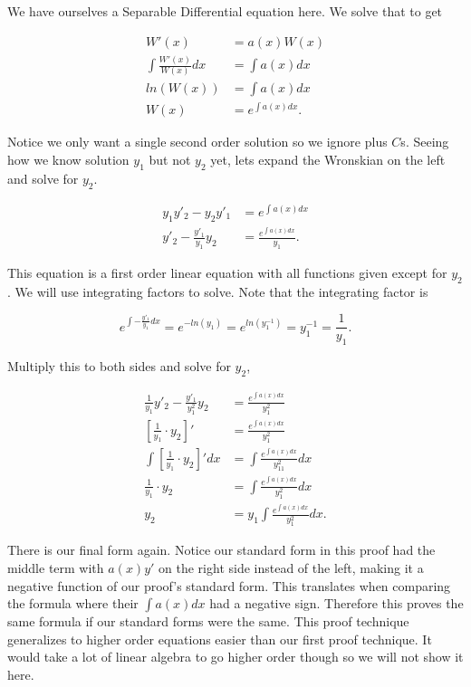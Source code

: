 \documentclass[12pt]{article}
\begin{document}
We have ourselves a Separable Differential equation here. We solve that to get

\begin{align*}
    W'(x)&=a(x)W(x) \\
    \int \frac{W'(x)}{W(x)} dx &= \int a(x) dx \\
    ln\left(W(x)\right) &= \int a(x) dx \\
    W(x)&=e^{\int a(x) dx}.
\end{align*}

Notice we only want a single second order solution so we ignore plus $C$s. Seeing how we know solution $y_1$ but not $y_2$ yet, lets expand the Wronskian on the left and solve for $y_2$.

\begin{align*}
    y_1y'_2-y_2y'_1&=e^{\int a(x) dx} \\
    y'_2-\frac{y'_1}{y_1}y_2&=\frac{e^{\int a(x) dx}}{y_1}.
\end{align*}

This equation is a first order linear equation with all functions given except for $y_2$. We will use integrating factors to solve. Note that the integrating factor is

\begin{equation*}
    e^{\int -\frac{y'_1}{y_1}dx}=e^{-ln(y_1)}=e^{ln(y_1^{-1})}=y_1^{-1}=\frac{1}{y_1}.
\end{equation*}

Multiply this to both sides and solve for $y_2$,

\begin{align*}
    \frac{1}{y_1}y'_2-\frac{y'_1}{y_1^2}y_2&=\frac{e^{\int a(x) dx}}{y_1^2} \\
    \left[\frac{1}{y_1}\cdot y_2\right]'&=\frac{e^{\int a(x) dx}}{y_1^2} \\
    \int \left[\frac{1}{y_1}\cdot y_2\right]'dx&=\int \frac{e^{\int a(x) dx}}{y_11^2} dx \\
    \frac{1}{y_1}\cdot y_2&=\int \frac{e^{\int a(x) dx}}{y_1^2} dx \\
    y_2&=y_1 \int \frac{e^{\int a(x) dx}}{y_1^2} dx.
\end{align*}

There is our final form again. Notice our standard form in this proof had the middle term with $a(x)y'$ on the right side instead of the left, making it a negative function of our proof's standard form. This translates when comparing the formula where their $\int a(x) dx$ had a negative sign. Therefore this proves the same formula if our standard forms were the same. This proof technique generalizes to higher order equations easier than our first proof technique. It would take a lot of linear algebra to go higher order though so we will not show it here.
\end{document}
